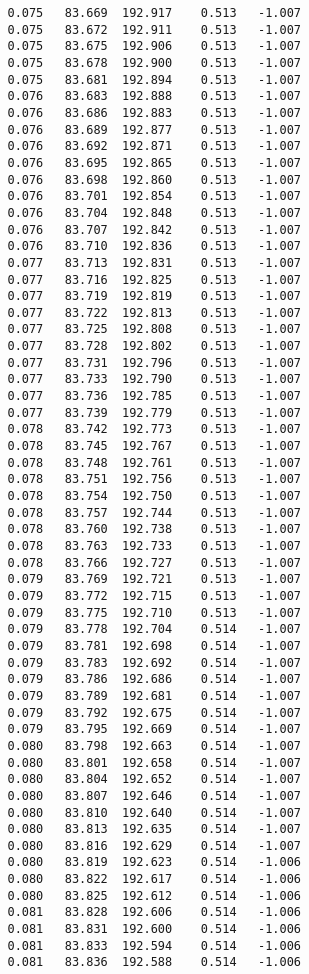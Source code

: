 \begin{verbatim}
   0.075   83.669  192.917    0.513   -1.007
   0.075   83.672  192.911    0.513   -1.007
   0.075   83.675  192.906    0.513   -1.007
   0.075   83.678  192.900    0.513   -1.007
   0.075   83.681  192.894    0.513   -1.007
   0.076   83.683  192.888    0.513   -1.007
   0.076   83.686  192.883    0.513   -1.007
   0.076   83.689  192.877    0.513   -1.007
   0.076   83.692  192.871    0.513   -1.007
   0.076   83.695  192.865    0.513   -1.007
   0.076   83.698  192.860    0.513   -1.007
   0.076   83.701  192.854    0.513   -1.007
   0.076   83.704  192.848    0.513   -1.007
   0.076   83.707  192.842    0.513   -1.007
   0.076   83.710  192.836    0.513   -1.007
   0.077   83.713  192.831    0.513   -1.007
   0.077   83.716  192.825    0.513   -1.007
   0.077   83.719  192.819    0.513   -1.007
   0.077   83.722  192.813    0.513   -1.007
   0.077   83.725  192.808    0.513   -1.007
   0.077   83.728  192.802    0.513   -1.007
   0.077   83.731  192.796    0.513   -1.007
   0.077   83.733  192.790    0.513   -1.007
   0.077   83.736  192.785    0.513   -1.007
   0.077   83.739  192.779    0.513   -1.007
   0.078   83.742  192.773    0.513   -1.007
   0.078   83.745  192.767    0.513   -1.007
   0.078   83.748  192.761    0.513   -1.007
   0.078   83.751  192.756    0.513   -1.007
   0.078   83.754  192.750    0.513   -1.007
   0.078   83.757  192.744    0.513   -1.007
   0.078   83.760  192.738    0.513   -1.007
   0.078   83.763  192.733    0.513   -1.007
   0.078   83.766  192.727    0.513   -1.007
   0.079   83.769  192.721    0.513   -1.007
   0.079   83.772  192.715    0.513   -1.007
   0.079   83.775  192.710    0.513   -1.007
   0.079   83.778  192.704    0.514   -1.007
   0.079   83.781  192.698    0.514   -1.007
   0.079   83.783  192.692    0.514   -1.007
   0.079   83.786  192.686    0.514   -1.007
   0.079   83.789  192.681    0.514   -1.007
   0.079   83.792  192.675    0.514   -1.007
   0.079   83.795  192.669    0.514   -1.007
   0.080   83.798  192.663    0.514   -1.007
   0.080   83.801  192.658    0.514   -1.007
   0.080   83.804  192.652    0.514   -1.007
   0.080   83.807  192.646    0.514   -1.007
   0.080   83.810  192.640    0.514   -1.007
   0.080   83.813  192.635    0.514   -1.007
   0.080   83.816  192.629    0.514   -1.007
   0.080   83.819  192.623    0.514   -1.006
   0.080   83.822  192.617    0.514   -1.006
   0.080   83.825  192.612    0.514   -1.006
   0.081   83.828  192.606    0.514   -1.006
   0.081   83.831  192.600    0.514   -1.006
   0.081   83.833  192.594    0.514   -1.006
   0.081   83.836  192.588    0.514   -1.006

\end{verbatim}
